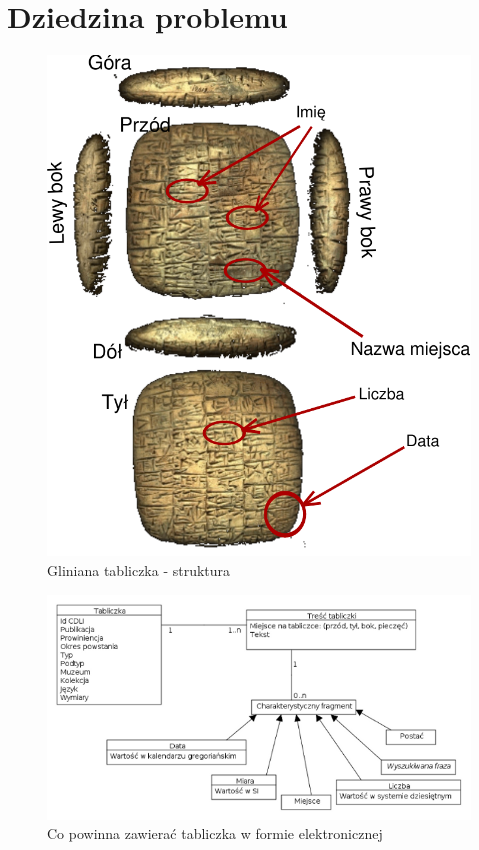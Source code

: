 \chapter{Dziedzina problemu}

\begin{figure}
 \centering
 \includegraphics[bb=0 0 342 405]{../diagramy/tabliczka.pdf}
 \caption{Gliniana tabliczka - struktura}
\end{figure}

\begin{figure}
 \centering
 \includegraphics[width=500px,bb=0 0 650 345]{../diagramy/Model-dziedziny.png}
 \caption{Co powinna zawierać tabliczka w formie elektronicznej}
\end{figure}

